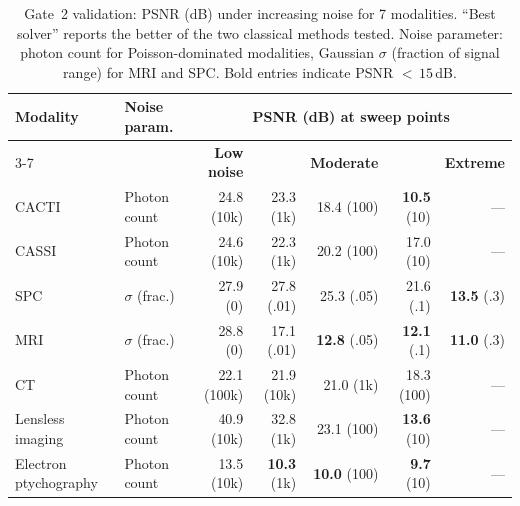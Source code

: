 \documentclass[11pt]{article}
\theoremstyle{definition}
\begin{document}
\begin{table}[htbp]
\centering
\caption{Gate~2 validation: PSNR (dB) under increasing noise for 7
modalities.  ``Best solver'' reports the better of the two classical
methods tested.  Noise parameter: photon count for Poisson-dominated
modalities, Gaussian $\sigma$ (fraction of signal range) for
MRI and SPC.  Bold entries indicate PSNR ${<}\,15$\,dB.}
\label{tab:gate2}
\small
\begin{tabular}{l l r r r r r}
\toprule
\textbf{Modality} & \textbf{Noise param.} &
  \multicolumn{5}{c}{\textbf{PSNR (dB) at sweep points}} \\
\cmidrule(lr){3-7}
 & & \textbf{Low noise} & & \textbf{Moderate} & & \textbf{Extreme} \\
\midrule
CACTI & Photon count
  & 24.8 \scriptsize{(10k)} & 23.3 \scriptsize{(1k)} & 18.4 \scriptsize{(100)} & \textbf{10.5} \scriptsize{(10)} & --- \\
CASSI & Photon count
  & 24.6 \scriptsize{(10k)} & 22.3 \scriptsize{(1k)} & 20.2 \scriptsize{(100)} & 17.0 \scriptsize{(10)} & --- \\
SPC & $\sigma$ (frac.)
  & 27.9 \scriptsize{(0)} & 27.8 \scriptsize{(.01)} & 25.3 \scriptsize{(.05)} & 21.6 \scriptsize{(.1)} & \textbf{13.5} \scriptsize{(.3)} \\
MRI & $\sigma$ (frac.)
  & 28.8 \scriptsize{(0)} & 17.1 \scriptsize{(.01)} & \textbf{12.8} \scriptsize{(.05)} & \textbf{12.1} \scriptsize{(.1)} & \textbf{11.0} \scriptsize{(.3)} \\
CT & Photon count
  & 22.1 \scriptsize{(100k)} & 21.9 \scriptsize{(10k)} & 21.0 \scriptsize{(1k)} & 18.3 \scriptsize{(100)} & --- \\
Lensless imaging & Photon count
  & 40.9 \scriptsize{(10k)} & 32.8 \scriptsize{(1k)} & 23.1 \scriptsize{(100)} & \textbf{13.6} \scriptsize{(10)} & --- \\
Electron ptychography & Photon count
  & 13.5 \scriptsize{(10k)} & \textbf{10.3} \scriptsize{(1k)} & \textbf{10.0} \scriptsize{(100)} & \textbf{9.7} \scriptsize{(10)} & --- \\
\bottomrule
\end{tabular}
\end{table}
\end{document}
